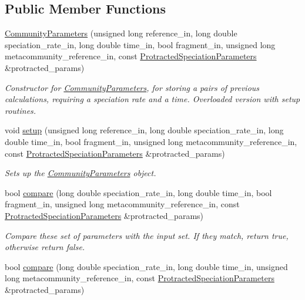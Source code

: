 \subsection*{Public Member Functions}
\begin{DoxyCompactItemize}
\item 
\hyperlink{struct_community_parameters_a0e50d3d34f62e01b6ae4f8d5070c73e8}{Community\+Parameters} (unsigned long reference\+\_\+in, long double speciation\+\_\+rate\+\_\+in, long double time\+\_\+in, bool fragment\+\_\+in, unsigned long metacommunity\+\_\+reference\+\_\+in, const \hyperlink{struct_protracted_speciation_parameters}{Protracted\+Speciation\+Parameters} \&protracted\+\_\+params)
\begin{DoxyCompactList}\small\item\em Constructor for \hyperlink{struct_community_parameters}{Community\+Parameters}, for storing a pairs of previous calculations, requiring a speciation rate and a time. Overloaded version with setup routines. \end{DoxyCompactList}\item 
void \hyperlink{struct_community_parameters_a1ca48258d1c165c1123dda0e1871ed5e}{setup} (unsigned long reference\+\_\+in, long double speciation\+\_\+rate\+\_\+in, long double time\+\_\+in, bool fragment\+\_\+in, unsigned long metacommunity\+\_\+reference\+\_\+in, const \hyperlink{struct_protracted_speciation_parameters}{Protracted\+Speciation\+Parameters} \&protracted\+\_\+params)
\begin{DoxyCompactList}\small\item\em Sets up the \hyperlink{struct_community_parameters}{Community\+Parameters} object. \end{DoxyCompactList}\item 
bool \hyperlink{struct_community_parameters_aa13987108a5697cd6144d44877cfd62c}{compare} (long double speciation\+\_\+rate\+\_\+in, long double time\+\_\+in, bool fragment\+\_\+in, unsigned long metacommunity\+\_\+reference\+\_\+in, const \hyperlink{struct_protracted_speciation_parameters}{Protracted\+Speciation\+Parameters} \&protracted\+\_\+params)
\begin{DoxyCompactList}\small\item\em Compare these set of parameters with the input set. If they match, return true, otherwise return false. \end{DoxyCompactList}\item 
bool \hyperlink{struct_community_parameters_a7267f97bb499f09b84d4cd17f1164c27}{compare} (long double speciation\+\_\+rate\+\_\+in, long double time\+\_\+in, unsigned long metacommunity\+\_\+reference\+\_\+in, const \hyperlink{struct_protracted_speciation_parameters}{Protracted\+Speciation\+Parameters} \&protracted\+\_\+params)

\end{DoxyCompactItemize}
